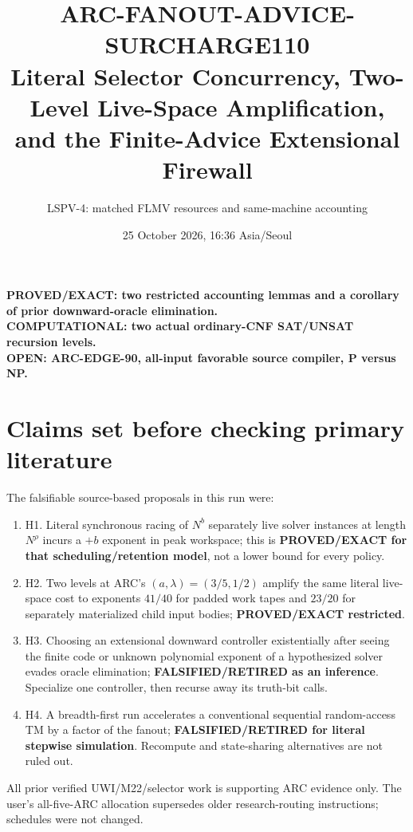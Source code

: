 \documentclass[11pt]{article}
\title{ARC-FANOUT-ADVICE-SURCHARGE110\\
\large Literal Selector Concurrency, Two-Level Live-Space Amplification, and the Finite-Advice Extensional Firewall}
\author{LSPV-4: matched FLMV resources and same-machine accounting}
\date{25 October 2026, 16:36 Asia/Seoul}
\begin{document}
\maketitle
\begin{center}
\textbf{PROVED/EXACT: two restricted accounting lemmas and a corollary of prior downward-oracle elimination.}\\
\textbf{COMPUTATIONAL: two actual ordinary-CNF SAT/UNSAT recursion levels.}\\
\textbf{OPEN: ARC-EDGE-90, all-input favorable source compiler, P versus NP.}
\end{center}

\section{Claims set before checking primary literature}
The falsifiable source-based proposals in this run were:
\begin{enumerate}
\item[] H1. Literal synchronous racing of $N^b$ separately live solver instances at length $N^\rho$ incurs a $+b$ exponent in peak workspace; this is \textbf{PROVED/EXACT for that scheduling/retention model}, not a lower bound for every policy.
\item[] H2. Two levels at ARC's $(a,\lambda)=(3/5,1/2)$ amplify the same literal live-space cost to exponents $41/40$ for padded work tapes and $23/20$ for separately materialized child input bodies; \textbf{PROVED/EXACT restricted}.
\item[] H3. Choosing an extensional downward controller existentially after seeing the finite code or unknown polynomial exponent of a hypothesized solver evades oracle elimination; \textbf{FALSIFIED/RETIRED as an inference}. Specialize one controller, then recurse away its truth-bit calls.
\item[] H4. A breadth-first run accelerates a conventional sequential random-access TM by a factor of the fanout; \textbf{FALSIFIED/RETIRED for literal stepwise simulation}. Recompute and state-sharing alternatives are not ruled out.
\end{enumerate}
All prior verified UWI/M22/selector work is supporting ARC evidence only. The user's all-five-ARC allocation supersedes older research-routing instructions; schedules were not changed.
\end{document}
